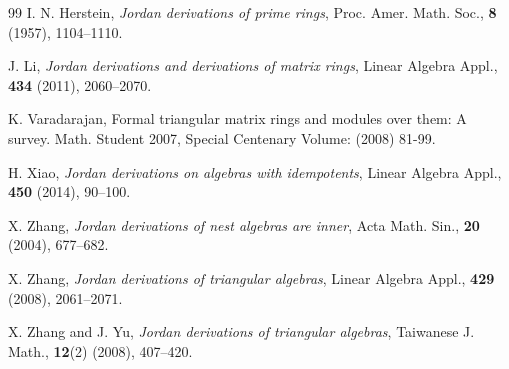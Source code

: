 \documentclass[12pt, reqno]{amsart}
\theoremstyle{definition}
\numberwithin{equation}{section}
\begin{document}
\begin{thebibliography}{99}
I. N. Herstein, \emph{Jordan derivations of prime rings}, Proc. Amer. Math. Soc., \textbf{8} (1957), 1104--1110.

J. Li, \emph{Jordan derivations and derivations of matrix rings}, Linear Algebra Appl., \textbf{434} (2011), 2060--2070.

K. Varadarajan, Formal triangular matrix rings and modules over them: A survey. Math. Student 2007, Special Centenary Volume: (2008) 81-99.

H. Xiao, \emph{Jordan derivations on algebras with idempotents}, Linear Algebra Appl., \textbf{450} (2014), 90--100.

X. Zhang, \emph{Jordan derivations of nest algebras are inner}, Acta Math. Sin., \textbf{20} (2004), 677--682.

X. Zhang, \emph{Jordan derivations of triangular algebras}, Linear Algebra Appl., \textbf{429} (2008), 2061--2071.

X. Zhang and J. Yu, \emph{Jordan derivations of triangular algebras}, Taiwanese J. Math., \textbf{12}(2) (2008), 407--420.

\end{thebibliography}
\end{document}
